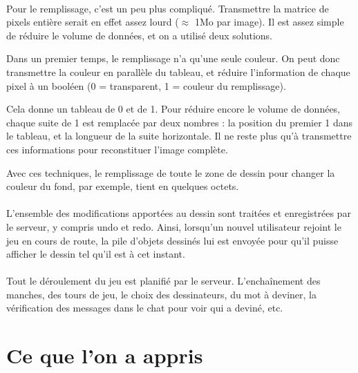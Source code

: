 \documentclass[11pt,a4paper]{article}
\begin{document}
                \paragraph{}
                Pour le remplissage, c'est un peu plus compliqué.
                Transmettre la matrice de pixels entière serait en effet assez lourd ($\approx$ 1Mo par image).
                Il est assez simple de réduire le volume de données, et on a utilisé deux solutions.
                
                Dans un premier temps, le remplissage n'a qu'une seule couleur.
                On peut donc transmettre la couleur en parallèle du tableau,
                et réduire l'information de chaque pixel à un booléen
                (0 = transparent, 1 = couleur du remplissage).

                Cela donne un tableau de 0 et de 1.
                Pour réduire encore le volume de données,
                chaque suite de 1 est remplacée par deux nombres :
                la position du premier 1 dans le tableau, et la longueur de la suite horizontale.
                Il ne reste plus qu'à transmettre ces informations pour reconstituer l'image complète.

                Avec ces techniques, le remplissage de toute le zone de dessin pour changer la couleur du fond,
                par exemple, tient en quelques octets.
                \paragraph{}
                L'ensemble des modifications apportées au dessin sont traitées et enregistrées par le serveur,
                y compris undo et redo.
                Ainsi, lorsqu'un nouvel utilisateur rejoint le jeu en cours de route,
                la pile d'objets dessinés lui est envoyée pour qu'il puisse afficher le dessin tel qu'il est à cet instant.
                \paragraph{}
                Tout le déroulement du jeu est planifié par le serveur.
                L'enchaînement des manches, des tours de jeu, le choix des dessinateurs,
                du mot à deviner, la vérification des messages dans le chat pour voir qui a deviné, etc.
    \section{Ce que l'on a appris}
\end{document}

